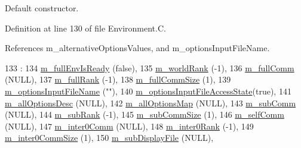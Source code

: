 Default constructor. 



Definition at line 130 of file Environment.\-C.



References m\-\_\-alternative\-Options\-Values, and m\-\_\-options\-Input\-File\-Name.


\begin{DoxyCode}
133   :
134   \hyperlink{class_q_u_e_s_o_1_1_base_environment_a62020b48a3506aa067d1c94c461cb11e}{m\_fullEnvIsReady}             (\textcolor{keyword}{false}),
135   \hyperlink{class_q_u_e_s_o_1_1_base_environment_a464cab923ada0e14c6e3a4000c2ea385}{m\_worldRank}                  (-1),
136   \hyperlink{class_q_u_e_s_o_1_1_base_environment_a8e80c9067b0875c419f1b9ecccbdb46d}{m\_fullComm}                   (NULL),
137   \hyperlink{class_q_u_e_s_o_1_1_base_environment_a0bfa53f6bdaec0a6aa3dc00ee2c0101f}{m\_fullRank}                   (-1),
138   \hyperlink{class_q_u_e_s_o_1_1_base_environment_ad5be3e52676db90de1321bc94233c15d}{m\_fullCommSize}               (1),
139   \hyperlink{class_q_u_e_s_o_1_1_base_environment_a37195909442a817980e1cf8392b9e63d}{m\_optionsInputFileName}       (\textcolor{stringliteral}{""}),
140   \hyperlink{class_q_u_e_s_o_1_1_base_environment_a48ea9a77af61344a313dfd7390b414b4}{m\_optionsInputFileAccessState}(\textcolor{keyword}{true}),
141   \hyperlink{class_q_u_e_s_o_1_1_base_environment_aac5465b02be108536bda1b5627456c97}{m\_allOptionsDesc}             (NULL),
142   \hyperlink{class_q_u_e_s_o_1_1_base_environment_a2d8e668313b18f57e4607c3bec1ecda2}{m\_allOptionsMap}              (NULL),
143   \hyperlink{class_q_u_e_s_o_1_1_base_environment_ac8d7b6062d9a58ef1a36eb95753498b4}{m\_subComm}                    (NULL),
144   \hyperlink{class_q_u_e_s_o_1_1_base_environment_acecae0962d56bae97b6476c7514b428f}{m\_subRank}                    (-1),
145   \hyperlink{class_q_u_e_s_o_1_1_base_environment_a4c7b8104e4bb3f1456aa2d85b4dc9a03}{m\_subCommSize}                (1),
146   \hyperlink{class_q_u_e_s_o_1_1_base_environment_a8f1159427c10aa4dfee51936d46103da}{m\_selfComm}                   (NULL),
147   \hyperlink{class_q_u_e_s_o_1_1_base_environment_a5107d456b4267a20f3f48222e52f0c7b}{m\_inter0Comm}                 (NULL),
148   \hyperlink{class_q_u_e_s_o_1_1_base_environment_a1feb61fba41bc96f4913892df85e6853}{m\_inter0Rank}                 (-1),
149   \hyperlink{class_q_u_e_s_o_1_1_base_environment_ad7a98e45d9c0379a78ee7937f83f3ec1}{m\_inter0CommSize}             (1),
150   \hyperlink{class_q_u_e_s_o_1_1_base_environment_a52b4275aa8ee85994dd304d9fe95c9c5}{m\_subDisplayFile}             (NULL),

\end{DoxyCode}
